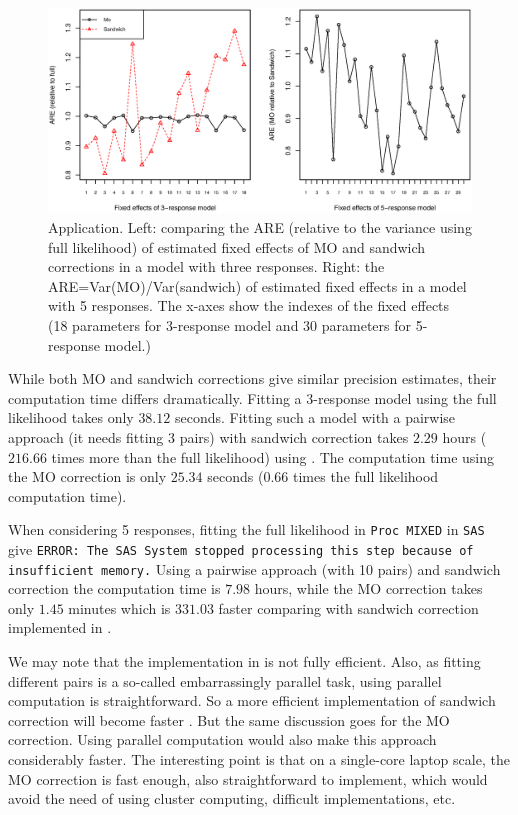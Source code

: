 \documentclass[11pt,a5paper,twoside]{book}
\begin{document}
\begin{figure}[htb]
\begin{center}
\includegraphics[trim=0 75 0 20,width=\textwidth]{fig_hear_new.eps}
\caption[Application (hearing data)]{Application. Left: comparing the ARE (relative to the variance using full likelihood) of estimated fixed effects of MO and sandwich corrections in a model with three responses. Right: the ARE=Var(MO)/Var(sandwich) of estimated fixed effects in a model with 5 responses. The x-axes show the indexes of the fixed effects (18 parameters for 3-response model and 30 parameters for 5-response model.)}
\label{fig_app}
\end{center}
\end{figure}

While both MO and sandwich corrections give similar precision estimates, their computation time differs dramatically. Fitting a 3-response model using the full likelihood takes only $38.12$ seconds. Fitting such a model  with a pairwise approach (it needs fitting 3 pairs) with sandwich correction takes $2.29$ hours ($216.66$ times more than the full likelihood) using \cite{pair_lin}. The computation time using the MO correction is only $25.34$ seconds ($0.66$ times the full likelihood computation time).

When considering 5 responses, fitting the full likelihood in {\tt{Proc MIXED}} in {\tt{SAS}} give {\tt{ERROR: The SAS System stopped processing this step because of insufficient memory.}} Using a pairwise approach (with 10 pairs) and sandwich correction the computation time is $7.98$ hours, while the MO correction takes only $1.45$ minutes which is $331.03$ faster comparing with sandwich correction implemented in \cite{pair_lin}.   

We may note that the implementation in \cite{pair_lin} is not fully efficient. Also, as fitting different pairs is a so-called embarrassingly parallel task, using parallel computation is straightforward. So a more efficient implementation of sandwich correction will become faster \citep[as an example]{ivanova2017}. But the same discussion goes for the MO correction. Using parallel computation would also make this approach considerably faster. The interesting point is that on a single-core laptop scale, the MO correction is fast enough, also straightforward to implement, which would avoid the need of using cluster computing, difficult implementations, etc.
\end{document}
